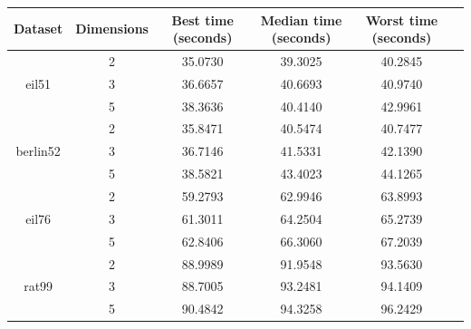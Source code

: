 \documentclass[conference]{IEEEtran}
\begin{document}
\begin{table}[h]
    \centering
    \begin{tabular}{|c|c|c|c|c|c|}
        \hline 
        Dataset & Dimensions & Best time (seconds) & Median time (seconds) & Worst time (seconds) \\
        \hline
        & 2 & 35.0730 & 39.3025 & 40.2845 \\
        eil51 & 3 & 36.6657 & 40.6693 & 40.9740 \\
        & 5 & 38.3636 & 40.4140 & 42.9961 \\
        \hline
        & 2 & 35.8471 & 40.5474 & 40.7477 \\
        berlin52 & 3 & 36.7146 & 41.5331 & 42.1390 \\
        & 5 & 38.5821 & 43.4023 & 44.1265 \\
        \hline
        & 2 & 59.2793 & 62.9946 & 63.8993 \\
        eil76 & 3 & 61.3011 & 64.2504 & 65.2739 \\
        & 5 & 62.8406 & 66.3060 & 67.2039 \\
        \hline
        & 2 & 88.9989 & 91.9548 & 93.5630 \\
        rat99 & 3 & 88.7005 & 93.2481 & 94.1409 \\
        & 5 & 90.4842 & 94.3258 & 96.2429 \\
        \hline
    \end{tabular}
     \label{Runtime results for the genetic algorithm}
\end{table}
\end{document}
